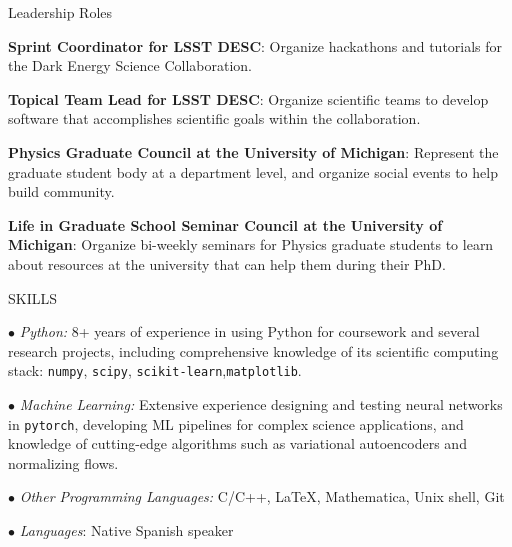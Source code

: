 \documentclass{resume} %
\newcommand{\pytorch}[0]{\texttt{pytorch}}
\begin{document}
\begin{rSection}{Leadership Roles} \itemsep -3pt \vspace*{-.25cm}
\item{\textbf{Sprint Coordinator for LSST DESC}: Organize hackathons and tutorials for the Dark Energy Science Collaboration.}

\item{\textbf{Topical Team Lead for LSST DESC}: Organize scientific teams to develop software that accomplishes scientific goals within the collaboration.}

\item{\textbf{Physics Graduate Council at the University of Michigan}: Represent the graduate student body at a department level, and organize social events to help build community.}

\item{\textbf{Life in Graduate School Seminar Council at the University of Michigan}: Organize bi-weekly seminars for Physics graduate students to learn about resources at the university that can help them during their PhD.}
\end{rSection}


\begin{rSection}{SKILLS}
\vspace*{-0.3cm}
\item {\small $\bullet$} \textit{Python:} 8+ years of experience in using Python for coursework and several research projects, including comprehensive knowledge of its scientific computing stack: \texttt{numpy}, \texttt{scipy}, \texttt{scikit-learn},\texttt{matplotlib}.

\item {\small $\bullet$} \textit{Machine Learning:} Extensive experience designing and testing neural networks in \pytorch, developing ML pipelines for complex science applications, and knowledge of cutting-edge algorithms such as variational autoencoders and normalizing flows.

\item {\small $\bullet$} \textit{Other Programming Languages:} C/C++, \LaTeX, Mathematica, Unix shell, Git   

\item {\small $\bullet$} \textit{Languages}: Native Spanish speaker
\end{rSection}
\end{document}
